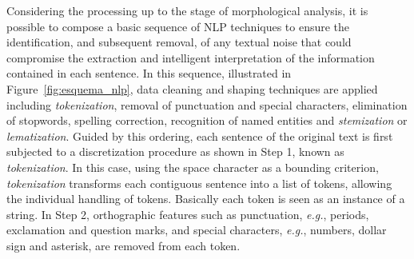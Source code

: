 \documentclass{ieeeaccess}
\begin{document}
Considering the processing up to the stage of morphological analysis, it is possible to compose a basic sequence of NLP techniques to ensure the identification, and subsequent removal, of any textual noise that could compromise the extraction and intelligent interpretation of the information contained in each sentence. In this sequence, illustrated in Figure~\ref{fig:esquema_nlp}, data cleaning and shaping techniques are applied including \textit{tokenization}, removal of punctuation and special characters, elimination of stopwords, spelling correction, recognition of named entities and \textit{stemization} or \textit{lematization}. Guided by this ordering, each sentence of the original text is first subjected to a discretization procedure as shown in Step 1, known as \textit{tokenization}. In this case, using the space character as a bounding criterion, \textit{tokenization} transforms each contiguous sentence into a list of tokens, allowing the individual handling of tokens. Basically each token is seen as an instance of a string. In Step 2, orthographic features such as punctuation, \textit{e.g.}, periods, exclamation and question marks, and special characters, \textit{e.g.}, numbers, dollar sign and asterisk, are removed from each token.

\end{document}
